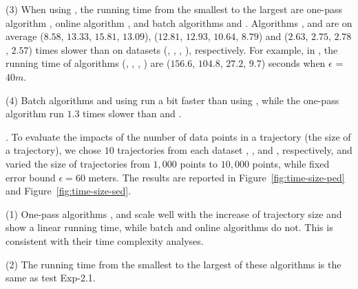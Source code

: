 \sstab (3) When using \sed, the running time from the smallest to the largest are one-pass algorithm \cised, online algorithm \squishe, and batch algorithms \tpa and \dpa. 
Algorithms \tpa, \dpa and \squishe are on average
($8.58$, $13.33$, $15.81$, $13.09$), ($12.81$, $12.93$, $10.64$, $8.79$) and
($2.63$, $2.75$, $2.78$, $2.57$) times slower than \cised on datasets (\ucar, \geolife, \mopsi, \act), respectively.
%
For example, in \mopsi, the running time of algorithms
(\tpa, \dpa, \squishe, \cised) are  ($156.6$, $104.8$, $27.2$, $9.7$) seconds when $\epsilon$ = $40m$.

\sstab (4) Batch algorithms \dpa and \tpa using \sed run a bit faster than using
\ped, while the one-pass algorithm \cised run $1.3$ times slower than \siped and \operb.




.
To evaluate the impacts of the number of data points in a trajectory (\ie the size of a trajectory),
we chose $10$ trajectories from each dataset \ucar, \geolife, \mopsi and \act, respectively,
and varied the size  of trajectories from $1,000$ points to $10,000$ points, while fixed error bound $\epsilon = 60$ meters.
The results are reported in Figure~\ref{fig:time-size-ped} and Figure~\ref{fig:time-size-sed}.

\sstab(1) One-pass algorithms \siped, \operb and \cised scale well with the increase of trajectory size  and show a linear running time, while batch and online algorithms do not.
This is consistent with their time complexity analyses.

\sstab(2) The running time from the smallest to the largest of these algorithms is the same as test {Exp-2.1}.



